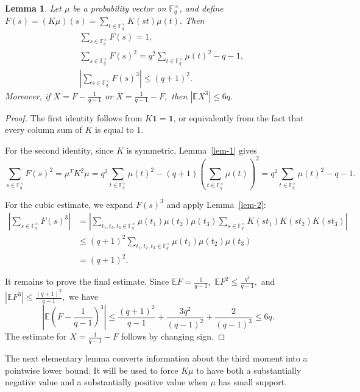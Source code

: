 \documentclass[11pt]{article}
\newtheorem{lemma}[theorem]{Lemma}
\newcommand{\1}{\mathbf{1}}
\begin{document}
\begin{lemma}\label{lem-3}
	Let \(\mu\) be a probability vector on \(\mathbb{F}_q^\times\), and define $	F(s)=(K\mu)(s)
	=
	\sum_{t\in\mathbb{F}_q^\times}K(st)\mu(t).$
	Then
	\begin{align*}
		&\sum_{s\in\mathbb{F}_q^\times}F(s)=1, \\
		&\sum_{s\in\mathbb{F}_q^\times}F(s)^2
		=
		q^2\sum_{t\in\mathbb{F}_q^\times}\mu(t)^2-q-1, \\
		&\left|
		\sum_{s\in\mathbb{F}_q^\times}F(s)^3
		\right|
		\le (q+1)^2.
	\end{align*}
	Moreover, if $X=F-\frac{1}{q-1}$ or $X=\frac{1}{q-1}-F,$
	then $|\mathbb{E}X^3|\le 6q.$
\end{lemma}

\begin{proof}
	The first identity follows from \(K\mathbf{1}=\mathbf{1}\), or equivalently from the fact that every column sum of \(K\) is equal to \(1\).
	
	For the second identity, since \(K\) is symmetric, Lemma~\ref{lem-1} gives
	\[
	\sum_{s\in\mathbb{F}_q^\times}F(s)^2
	=
	\mu^T K^2\mu
	=
	q^2\sum_{t\in\mathbb{F}_q^\times}\mu(t)^2
	-(q+1)\left(\sum_{t\in\mathbb{F}_q^\times}\mu(t)\right)^2=	q^2\sum_{t\in\mathbb{F}_q^\times}\mu(t)^2-q-1.
	\]
	
	For the cubic estimate, we expand \(F(s)^3\) and apply Lemma~\ref{lem-2}:
	\begin{align*}
		\left|
		\sum_{s\in\mathbb{F}_q^\times}F(s)^3
		\right|
		&=
		\left|
		\sum_{t_1,t_2,t_3\in\mathbb{F}_q^\times}
		\mu(t_1)\mu(t_2)\mu(t_3)
		\sum_{s\in\mathbb{F}_q^\times}
		K(st_1)K(st_2)K(st_3)
		\right|  \\
		&\le
		(q+1)^2
		\sum_{t_1,t_2,t_3\in\mathbb{F}_q^\times}
		\mu(t_1)\mu(t_2)\mu(t_3)  \\
		&=
		(q+1)^2.
	\end{align*}
	
	It remains to prove the final estimate. Since $\mathbb{E}F=\frac{1}{q-1},$ $\mathbb{E}F^2
	\le
	\frac{q^2}{q-1},$ and $	|\mathbb{E}F^3|
	\le
	\frac{(q+1)^2}{q-1},$
	we have
	\[	\left|
	\mathbb{E}\left(F-\frac{1}{q-1}\right)^3
	\right|
	\le
	\frac{(q+1)^2}{q-1}
	+
	\frac{3q^2}{(q-1)^2}
	+
	\frac{2}{(q-1)^3}  
	\le 6q.\]
	The estimate for \(X=\frac{1}{q-1}-F\) follows by changing sign.
\end{proof}

The next elementary lemma converts information about the third moment into a pointwise lower bound. It will be used to force \(K\mu\) to have both a substantially negative value and a substantially positive value when \(\mu\) has small support.
\end{document}
